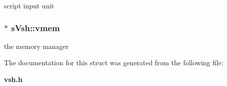 script input unit 

\subsubsection[{vmem}]{$\ast$ s\+Vsh\+::vmem}\label{a00007_a6ff199aeb0841047c1c4cd0a42f3c23a}


the memory manager 



The documentation for this struct was generated from the following file\+:\begin{DoxyCompactItemize}
\item 
{\bf vsh.\+h}\end{DoxyCompactItemize}
